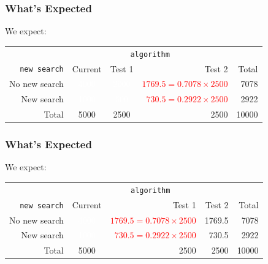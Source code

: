\documentclass[handout]{beamer}
\newcommand{\white}[1]{\textcolor{white}{#1}}
\newcommand{\red}[1]{\textcolor{red}{#1}}
\begin{document}
\begin{frame}
\frametitle{What's Expected}

We expect:

\begin{center}
  \begin{tabular}{r|ccr|r}
& \multicolumn{3}{c|}{{\tt algorithm}} & \\
       {\tt new search} & Current & Test 1 & Test 2 & Total \\ 
\hline
    No new search & \white{4000} & \white{2000} & \red{$1769.5=0.7078 \times 2500$} & 7078 \\ 
    New search & \white{1000} & \white{500} & \red{$730.5=0.2922 \times 2500$} & 2922 \\ 
\hline
    Total & 5000 & 2500 & 2500 & 10000 \\ 
  \end{tabular}
\end{center}


\end{frame}


\begin{frame}
\frametitle{What's Expected}

We expect:
\begin{center}
  \begin{tabular}{r|crr|r}
& \multicolumn{3}{c|}{{\tt algorithm}} & \\
       {\tt new search} & Current & Test 1 & Test 2 & Total \\ 
\hline
    No new search & \white{4000} & \red{$1769.5=0.7078 \times 2500$} & 1769.5 & 7078 \\ 
    New search & \white{1000} & \red{$730.5=0.2922 \times 2500$} & 730.5 & 2922 \\ 
\hline
    Total & 5000 & 2500 & 2500 & 10000 \\ 
  \end{tabular}
\end{center}

\end{frame}
\end{document}
